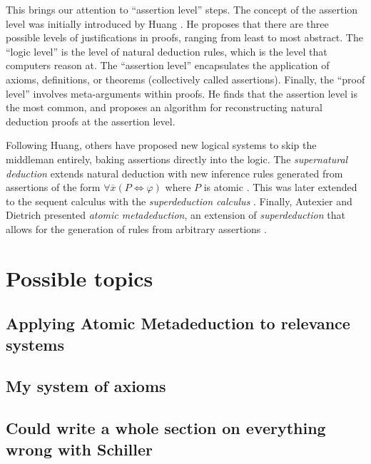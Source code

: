\documentclass[12pt]{article}
\begin{document}
This brings our attention to ``assertion level'' steps. The concept of the
assertion level was initially introduced by Huang \cite{assertion}. He proposes
that there are three possible levels of justifications in proofs, ranging from
least to most abstract. The ``logic level'' is the level of natural deduction
rules, which is the level that computers reason at. The ``assertion level''
encapsulates the application of axioms, definitions, or theorems (collectively
called assertions). Finally, the ``proof level'' involves meta-arguments within
proofs. He finds that the assertion level is the most common, and proposes an
algorithm for reconstructing natural deduction proofs at the assertion level.

Following Huang, others have proposed new logical systems to skip the middleman
entirely, baking assertions directly into the logic. The \textit{supernatural
deduction} extends natural deduction with new inference rules generated from
assertions of the form $\forall\overline{x}(P\Leftrightarrow\varphi)$ where $P$
is atomic \cite{supernaturalDeduction}. This was later extended to the sequent
calculus with the \textit{superdeduction calculus} \cite{superdeduction}.
Finally, Autexier and Dietrich presented \textit{atomic metadeduction}, an
extension of \textit{superdeduction} that allows for the generation of rules
from arbitrary assertions \cite{AtomicMetadeduction}.

\section{Possible topics}
\subsection{Applying Atomic Metadeduction to relevance systems}
\subsection{My system of axioms}
\subsection{Could write a whole section on everything wrong with Schiller}

\printbibliography
\end{document}
